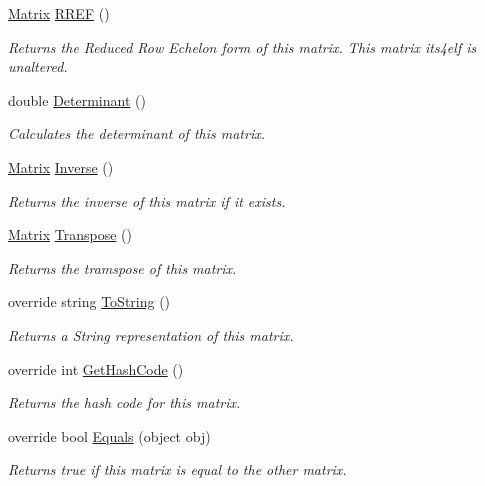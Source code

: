 \begin{DoxyCompactItemize}
\mbox{\hyperlink{class_matrix_demo_1_1_r_t_w_1_1_matrix}{Matrix}} \mbox{\hyperlink{class_matrix_demo_1_1_r_t_w_1_1_matrix_ab5b22330a32e73b322522e9c60b8502e}{R\+R\+EF}} ()
\begin{DoxyCompactList}\small\item\em Returns the Reduced Row Echelon form of this matrix. This matrix its4elf is unaltered. \end{DoxyCompactList}\item 
double \mbox{\hyperlink{class_matrix_demo_1_1_r_t_w_1_1_matrix_a1bf322e5e6ff6ae935c74a91df5bb51c}{Determinant}} ()
\begin{DoxyCompactList}\small\item\em Calculates the determinant of this matrix. \end{DoxyCompactList}\item 
\mbox{\hyperlink{class_matrix_demo_1_1_r_t_w_1_1_matrix}{Matrix}} \mbox{\hyperlink{class_matrix_demo_1_1_r_t_w_1_1_matrix_a6d733a0dfeef17bf64c99671bc4cb116}{Inverse}} ()
\begin{DoxyCompactList}\small\item\em Returns the inverse of this matrix if it exists. \end{DoxyCompactList}\item 
\mbox{\hyperlink{class_matrix_demo_1_1_r_t_w_1_1_matrix}{Matrix}} \mbox{\hyperlink{class_matrix_demo_1_1_r_t_w_1_1_matrix_a2718067191d516f881e29baf49db7604}{Transpose}} ()
\begin{DoxyCompactList}\small\item\em Returns the tramspose of this matrix. \end{DoxyCompactList}\item 
override string \mbox{\hyperlink{class_matrix_demo_1_1_r_t_w_1_1_matrix_a6dcaf1d6a6050cea143f68da4a802900}{To\+String}} ()
\begin{DoxyCompactList}\small\item\em Returns a String representation of this matrix. \end{DoxyCompactList}\item 
override int \mbox{\hyperlink{class_matrix_demo_1_1_r_t_w_1_1_matrix_ad7f43b0fc8f78f4deb76238d99749d1d}{Get\+Hash\+Code}} ()
\begin{DoxyCompactList}\small\item\em Returns the hash code for this matrix. \end{DoxyCompactList}\item 
override bool \mbox{\hyperlink{class_matrix_demo_1_1_r_t_w_1_1_matrix_ac0f3f4cf1a7f5d36aff55a94d7ae6c92}{Equals}} (object obj)
\begin{DoxyCompactList}\small\item\em Returns true if this matrix is equal to the other matrix. \end{DoxyCompactList}\end{DoxyCompactItemize}
